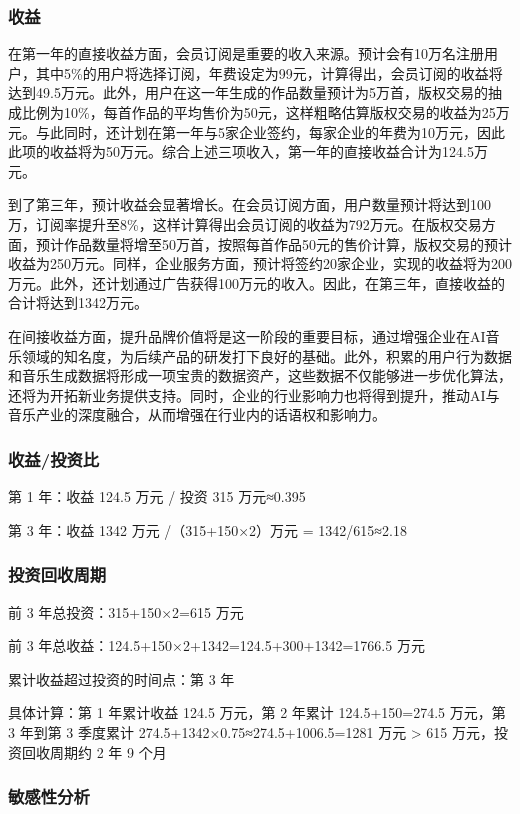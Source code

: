 \documentclass{base}
\numberwithin{figure}{section} %
\begin{document}
\subsubsection{收益}
在第一年的直接收益方面，会员订阅是重要的收入来源。预计会有10万名注册用户，其中5\%的用户将选择订阅，年费设定为99元，计算得出，会员订阅的收益将达到49.5万元。此外，用户在这一年生成的作品数量预计为5万首，版权交易的抽成比例为10\%，每首作品的平均售价为50元，这样粗略估算版权交易的收益为25万元。与此同时，还计划在第一年与5家企业签约，每家企业的年费为10万元，因此此项的收益将为50万元。综合上述三项收入，第一年的直接收益合计为124.5万元。

到了第三年，预计收益会显著增长。在会员订阅方面，用户数量预计将达到100万，订阅率提升至8\%，这样计算得出会员订阅的收益为792万元。在版权交易方面，预计作品数量将增至50万首，按照每首作品50元的售价计算，版权交易的预计收益为250万元。同样，企业服务方面，预计将签约20家企业，实现的收益将为200万元。此外，还计划通过广告获得100万元的收入。因此，在第三年，直接收益的合计将达到1342万元。

在间接收益方面，提升品牌价值将是这一阶段的重要目标，通过增强企业在AI音乐领域的知名度，为后续产品的研发打下良好的基础。此外，积累的用户行为数据和音乐生成数据将形成一项宝贵的数据资产，这些数据不仅能够进一步优化算法，还将为开拓新业务提供支持。同时，企业的行业影响力也将得到提升，推动AI与音乐产业的深度融合，从而增强在行业内的话语权和影响力。

\subsubsection{收益/投资比}

第 1 年：收益 124.5 万元 / 投资 315 万元≈0.395

第 3 年：收益 1342 万元 /（315+150×2）万元 = 1342/615≈2.18

\subsubsection{投资回收周期}

前 3 年总投资：315+150×2=615 万元

前 3 年总收益：124.5+150×2+1342=124.5+300+1342=1766.5 万元

累计收益超过投资的时间点：第 3 年

具体计算：第 1 年累计收益 124.5 万元，第 2 年累计 124.5+150=274.5 万元，第 3 年到第 3 季度累计 274.5+1342×0.75≈274.5+1006.5=1281 万元 > 615 万元，投资回收周期约 2 年 9 个月

\subsubsection{敏感性分析}
\end{document}
